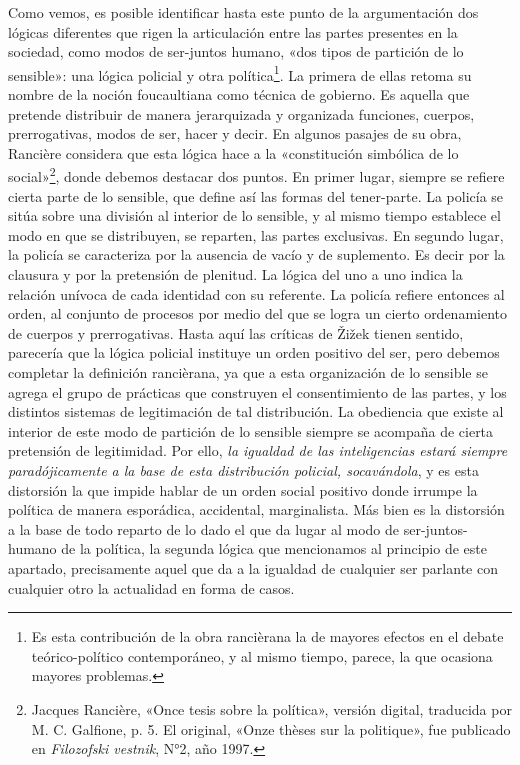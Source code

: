 Como vemos, es posible identificar hasta este punto de la argumentación dos lógicas diferentes que rigen la articulación entre las partes presentes en la sociedad, como modos de ser-juntos humano, «dos tipos de partición de lo sensible»: una lógica policial y otra política\footnote{Es esta contribución de la obra rancièrana la de mayores efectos en el debate teórico-político contemporáneo, y al mismo tiempo, parece, la que ocasiona mayores problemas.}. La primera de ellas retoma su nombre de la noción foucaultiana como técnica de gobierno. Es aquella que pretende distribuir de manera jerarquizada y organizada funciones, cuerpos, prerrogativas, modos de ser, hacer y decir. En algunos pasajes de su obra, Rancière considera que esta lógica hace a la «constitución simbólica de lo social»\footnote{Jacques Rancière, «Once tesis sobre la política», versión digital, traducida por M. C. Galfione, p. 5. El original, «Onze thèses sur la politique», fue publicado en \emph{Filozofski vestnik}, N°2, año 1997.}, donde debemos destacar dos puntos. En primer lugar, siempre se refiere cierta parte de lo sensible, que define así las formas del tener-parte. La policía se sitúa sobre una división al interior de lo sensible, y al mismo tiempo establece el modo en que se distribuyen, se reparten, las partes exclusivas. En segundo lugar, la policía se caracteriza por la ausencia de vacío y de suplemento. Es decir por la clausura y por la pretensión de plenitud. La lógica del uno a uno indica la relación unívoca de cada identidad con su referente. La policía refiere entonces al orden, al conjunto de procesos por medio del que se logra un cierto ordenamiento de cuerpos y prerrogativas. Hasta aquí las críticas de Žižek tienen sentido, parecería que la lógica policial instituye un orden positivo del ser, pero debemos completar la definición rancièrana, ya que a esta organización de lo sensible se agrega el grupo de prácticas que construyen el consentimiento de las partes, y los distintos sistemas de legitimación de tal distribución. La obediencia que existe al interior de este modo de partición de lo sensible siempre se acompaña de cierta pretensión de legitimidad. Por ello, \emph{la igualdad de las inteligencias estará siempre paradójicamente a la base de esta distribución policial, socavándola}, y es esta distorsión la que impide hablar de un orden social positivo donde irrumpe la política de manera esporádica, accidental, marginalista. Más bien es la distorsión a la base de todo reparto de lo dado el que da lugar al modo de ser-juntos-humano de la política, la segunda lógica que mencionamos al principio de este apartado, precisamente aquel que da a la igualdad de cualquier ser parlante con cualquier otro la actualidad en forma de casos.


